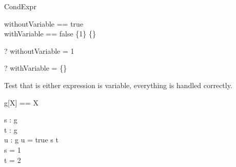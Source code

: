 \begin{zsection}
  \SECTION CondExpr
\end{zsection}

\begin{zed}
  withoutVariable == \IF true  \\
  withVariable == \IF false \THEN \{1\} \ELSE \{\}
\end{zed}

\begin{zed} \vdash? withoutVariable = 1 \end{zed}
\begin{zed} \vdash? withVariable = \{\} \end{zed}

Test that is either expression is variable, everything is handled 
correctly.
\begin{zed}
  g[X] == X
\end{zed}

\begin{axdef}
  s : g\\
  t : g\\
  u : g
\where
  u = \IF true \THEN s \ELSE t\\
  s = 1\\
  t = 2\\
\end{axdef}
